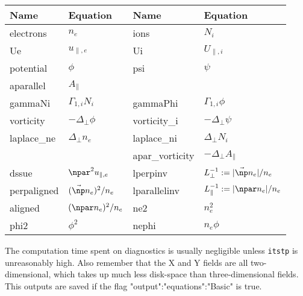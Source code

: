 \begin{longtable}{llll}
\toprule
\rowcolor{gray!50}\textbf{Name} &  \textbf{Equation} & \textbf{Name} &  \textbf{Equation}\\
\midrule
    electrons &$n_e$ &
    ions &$N_i$ \\
    Ue &$u_{\parallel,e}$ &
    Ui &$U_{\parallel,i}$ \\
    potential &$\phi$ &
    psi &$\psi$ \\
    aparallel &$A_\parallel$ & \\
    gammaNi & $\Gamma_{1,i} N_i$  &
    gammaPhi & $\Gamma_{1,i} \phi$  \\
    vorticity &$-\Delta_\perp\phi$ &
    vorticity\_i & $-\Delta_\perp \psi$ \\
    laplace\_ne &$\Delta_\perp n_e$ &
    laplace\_ni & $\Delta_\perp N_i$ \\
     & &
    apar\_vorticity &$-\Delta_\perp A_\parallel$ \\
    dssue & $\npar^2 u_{\parallel,e}$&
    lperpinv &$L_\perp^{-1} := |\vec\np n_e|/n_e$ \\
    perpaligned &$(\vec\np n_e)^2/n_e$ &
    lparallelinv &$L_\parallel^{-1} := |\npar n_e|/n_e$ \\
    aligned &$ (\npar n_e)^2/n_e$ &
    ne2 & $n_e^2$ \\
    phi2 & $\phi^2$ &
    nephi & $n_e\phi$ \\
\bottomrule
\end{longtable}
The computation time spent on diagnostics is usually negligible unless {\tt itstp}
is unreasonably high. Also remember that the X and Y fields are all
two-dimensional, which takes up much less disk-space than three-dimensional
fields. This outputs are saved if the flag "output":"equations":"Basic" is true.

